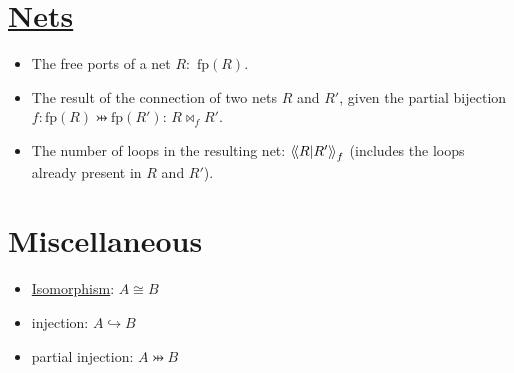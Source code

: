 \section{\texorpdfstring{\hyperref[nets]{Nets}}{Nets}}

\begin{itemize}
\item The free ports of a net $R$:~$\mathrm{fp}(R)$.
\item The result of the connection of two nets
  $R$ and
  $R'$, given
  the partial bijection
  $f:\mathrm{fp}(R)\pinj
  \mathrm{fp}(R')$:
  $R\bowtie_f
  R'$.
\item The number of loops in the resulting net:
  $\left\langle\!\left\langle R\middle|R'\right\rangle\!\right\rangle_f$
  (includes the loops already present in
  $R$ and
  $R'$).
\end{itemize}

\section{Miscellaneous}\label{notations-miscellaneous}

\begin{itemize}
\item \hyperref[isomorphism]{Isomorphism}: $A\cong B$
\item injection: $A\hookrightarrow B$
\item partial injection: $A\pinj B$
\end{itemize}

